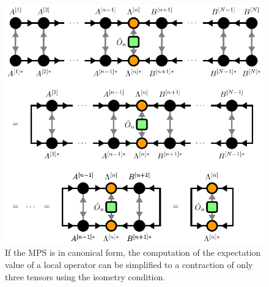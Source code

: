 \begin{figure}
	\centering
	\includegraphics[scale=1.0]{figures/tikz/Tensor_Networks/mps_canonical_form_local_expectation_value/mps_canonical_form_local_expectation_value.pdf}
	\caption{If the MPS is in canonical form, the computation of the expectation value of a local operator can be simplified to a contraction of only three tensors using the isometry condition.}
	\label{fig:mps_local_expectation_value_canonical}
\end{figure}

